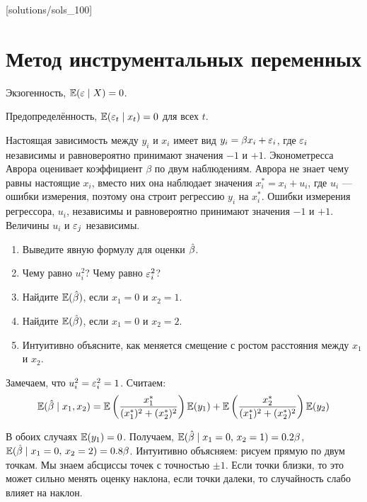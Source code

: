 [solutions/sols_100]

\chapter{Метод инструментальных переменных}



Экзогенность, $\mathbb{E}(\varepsilon\mid X)=0$.

Предопределённость, $\mathbb{E}(\varepsilon_t\mid x_t)=0$ для всех $t$.



\begin{problem}
Настоящая зависимость между $y_i$ и $x_i$ имеет вид $y_i=\beta x_i +\varepsilon_i$, где $\varepsilon_i$ независимы и равновероятно принимают значения $-1$ и $+1$. Эконометресса Аврора оценивает коэффициент $\beta$ по двум наблюдениям. Аврора не знает чему равны настоящие $x_i$, вместо них она наблюдает значения $x^*_i=x_i+u_i$, где $u_i$ — ошибки измерения, поэтому она строит регрессию $y_i$ на $x_i^*$. Ошибки измерения регрессора, $u_i$, независимы и равновероятно принимают значения $-1$ и $+1$. Величины $u_i$ и $\varepsilon_j$ независимы.
\begin{enumerate}
\item Выведите явную формулу для оценки $\hat{\beta}$.
\item Чему равно $u_i^2$? Чему равно $\varepsilon_i^2$?
\item Найдите $\mathbb{E}(\hat{\beta})$, если $x_1=0$ и $x_2=1$.
\item Найдите $\mathbb{E}(\hat{\beta})$, если $x_1=0$ и $x_2=2$.
\item Интуитивно объясните, как меняется смещение с ростом расстояния между $x_1$ и $x_2$.
\end{enumerate}


\begin{sol}
Замечаем, что $u_i^2=\varepsilon_i^2=1$. Считаем:
\[
\mathbb{E}(\hat{\beta} \mid x_1, x_2) = \mathbb{E}\left( \frac{x_1^*}{(x_1^*)^2  + (x_2^*)^2}\right) \mathbb{E}(y_1) + \mathbb{E}\left( \frac{x_2^*}{(x_1^*)^2  + (x_2^*)^2}\right) \mathbb{E}(y_2)
\]

В обоих случаях $\mathbb{E}(y_1)=0$. Получаем, $\mathbb{E}(\hat{\beta} \mid x_1=0, \, x_2=1)=0.2\beta$, $\mathbb{E}(\hat{\beta} \mid x_1=0, \, x_2=2)=0.8\beta$. Интуитивно объясняем: рисуем прямую по двум точкам. Мы знаем абсциссы точек с точностью $\pm 1$. Если точки близки, то это может сильно менять оценку наклона, если точки далеки, то случайность слабо влияет на наклон.
\end{sol}
\end{problem}


